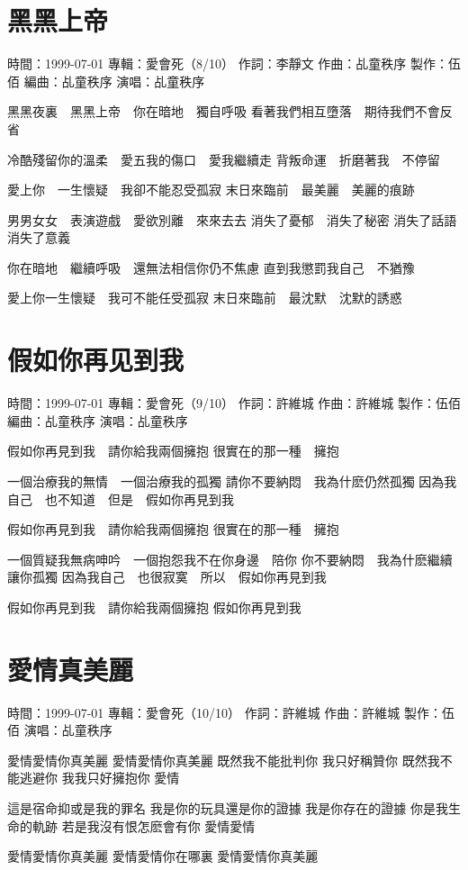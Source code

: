 \documentclass[UTF8,a4paper,oneside,twocolumn,12pt]{ctexbook}
\newcommand{\infopair}[2]{\textbullet #1：#2}
\newcommand{\zc}[1][伍佰]{\infopair{作詞}{#1}}
\newcommand{\zq}[1][伍佰]{\infopair{作曲}{#1}}
\newcommand{\bq}[1][伍佰]{\infopair{編曲}{#1}}
\newcommand{\zj}[1]{\infopair{專輯}{#1}}
\newcommand{\zz}[1]{\infopair{製作}{#1}}
\newcommand{\sj}[1]{\infopair{時間}{#1}}
\newenvironment{info}{\begin{flushleft}\kaishu
	}
	{\end{flushleft}\normalsize\yahei\par}
\newenvironment{lyric}{
	}
{}
\begin{document}
\section{黑黑上帝}
\begin{info}
	\sj{1999-07-01}
	\zj{愛會死（8/10）}
	\zc[李靜文]
	\zq[乩童秩序]
	\zz{伍佰}
	\bq[乩童秩序]
	\infopair{演唱}{乩童秩序}
\end{info}
\begin{lyric}
	黑黑夜裏　黑黑上帝　你在暗地　獨自呼吸
	看著我們相互墮落　期待我們不會反省

	冷酷殘留你的溫柔　愛五我的傷口　愛我繼續走
	背叛命運　折磨著我　不停留

	愛上你　一生懷疑　我卻不能忍受孤寂
	末日來臨前　最美麗　美麗的痕跡

	男男女女　表演遊戲　愛欲別離　來來去去
	消失了憂郁　消失了秘密
	消失了話語　消失了意義

	你在暗地　繼續呼吸　還無法相信你仍不焦慮
	直到我懲罰我自己　不猶豫

	愛上你一生懷疑　我可不能任受孤寂
	末日來臨前　最沈默　沈默的誘惑
\end{lyric}

\section{假如你再见到我}
\begin{info}
	\sj{1999-07-01}
	\zj{愛會死（9/10）}
	\zc[許維城]
	\zq[許維城]
	\zz{伍佰}
	\bq[乩童秩序]
	\infopair{演唱}{乩童秩序}
\end{info}
\begin{lyric}
	假如你再見到我　請你給我兩個擁抱
	很實在的那一種　擁抱

	一個治療我的無情　一個治療我的孤獨
	請你不要納悶　我為什麽仍然孤獨
	因為我自己　也不知道　但是　假如你再見到我

	假如你再見到我　請你給我兩個擁抱
	很實在的那一種　擁抱

	一個質疑我無病呻吟　一個抱怨我不在你身邊　陪你
	你不要納悶　我為什麽繼續讓你孤獨
	因為我自己　也很寂寞　所以　假如你再見到我

	假如你再見到我　請你給我兩個擁抱
	假如你再見到我
\end{lyric}

\section{愛情真美麗}
\begin{info}
	\sj{1999-07-01}
	\zj{愛會死（10/10）}
	\zc[許維城]
	\zq[許維城]
	\zz{伍佰}
	\infopair{演唱}{乩童秩序}
\end{info}
\begin{lyric}
	愛情愛情你真美麗
	愛情愛情你真美麗
	既然我不能批判你
	我只好稱贊你
	既然我不能逃避你
	我我只好擁抱你
	愛情

	這是宿命抑或是我的罪名
	我是你的玩具還是你的證據
	我是你存在的證據
	你是我生命的軌跡
	若是我沒有恨怎麽會有你
	愛情愛情

	愛情愛情你真美麗
	愛情愛情你在哪裏
	愛情愛情你真美麗
\end{lyric}
\end{document}
